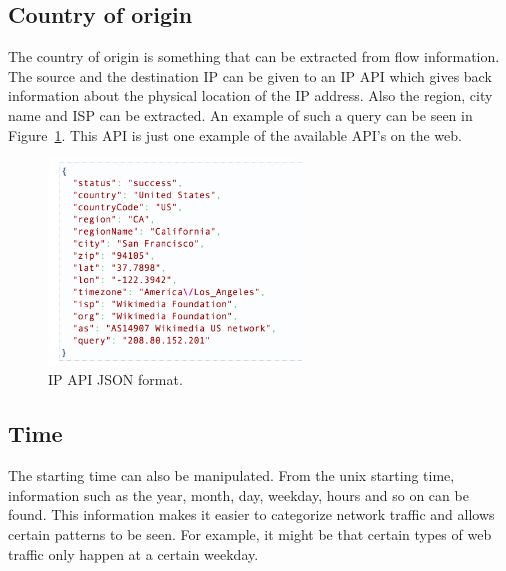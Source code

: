 \subsection{Country of origin}
The country of origin is something that can be extracted from flow information. The source and the destination IP can be given to an IP API which gives back information about the physical location of the IP address. Also the region, city name and ISP can be extracted. An example of such a query can be seen in Figure~\ref{fig:ipapi}. This API is just one example of the available API's on the web. \cite{ipAPI}

\begin{figure}[H]
\centering
\includegraphics[width=0.6\textwidth]{Figures/ip-api}
\decoRule
\caption[IP API JSON format]{IP API JSON format. \cite{ipAPI}}
\label{fig:ipapi}
\end{figure}

\subsection{Time}
The starting time can also be manipulated. From the unix starting time, information such as the year, month, day, weekday, hours and so on can be found. This information makes it easier to categorize network traffic and allows certain patterns to be seen. For example, it might be that certain types of web traffic only happen at a certain weekday.



